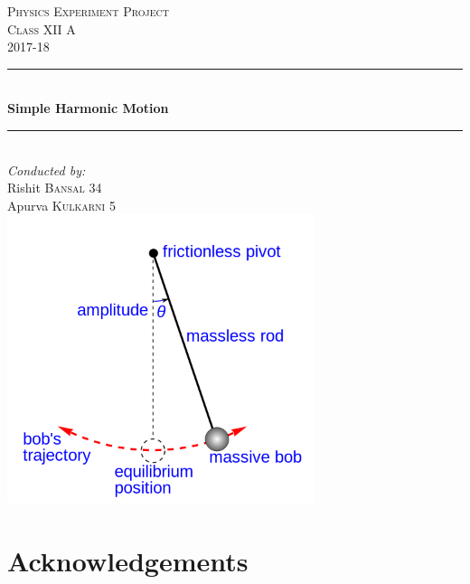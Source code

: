 \documentclass[12pt, twoside]{report}
\numberwithin{equation}{section}
\begin{document}
\begin{titlepage}
  
\newcommand{\HRule}{\rule{\linewidth}{0.5mm}}

\center
\vspace*{3cm} 

\textsc{\LARGE Physics Experiment Project}\\[1.5cm]
\textsc{\Large Class XII A}\\[0.5cm]
\textsc{\large 2017-18}\\[0.5cm]


\HRule \\[0.4cm]
{ \huge \bfseries Simple Harmonic Motion}\\[0.4cm]
\HRule \\[1.5cm]
 

\Large \emph{Conducted by:}\\
\large Rishit \textsc{Bansal 34}\\
\large Apurva \textsc{Kulkarni 5}\\[2cm]

\includegraphics[width=9cm]{title2}
\vfill

\end{titlepage}
\cleardoublepage
\chapter{Acknowledgements}

\cleardoublepage
\setcounter{chapter}{-42}
\end{document}
